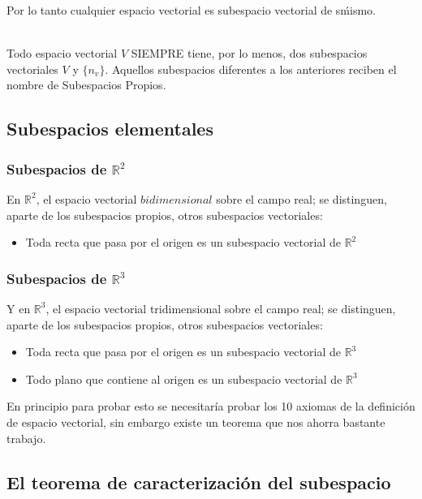 Por lo tanto cualquier espacio vectorial es subespacio vectorial de s\' mismo.

~\\
Todo espacio vectorial $V$ SIEMPRE tiene, por lo menos, dos subespacios vectoriales $V$ y $\lbrace n_v\rbrace$. Aquellos subespacios diferentes a los anteriores reciben el nombre de Subespacios Propios.
~\\
\subsection{Subespacios elementales}
\subsubsection{Subespacios de $\mathbb{R}^2$}
En $\mathbb{R}^2$, el espacio vectorial $bidimensional$ sobre el campo real; se distinguen, aparte de los subespacios propios, otros subespacios vectoriales:


\begin{itemize}
\item Toda recta que pasa por el origen es un subespacio vectorial de $\mathbb{R}^2$

\end{itemize}
\subsubsection{Subespacios de $\mathbb{R}^3$}
Y en $\mathbb{R}^3$, el espacio vectorial tridimensional sobre el campo real; se distinguen, aparte de los subespacios propios, otros subespacios vectoriales:

\begin{itemize}
\item Toda recta que pasa por el origen es un subespacio vectorial de $\mathbb{R}^3$
\item Todo plano que contiene al origen es un subespacio vectorial de $\mathbb{R}^3$
\end{itemize}

En principio para probar esto se necesitaría probar los 10 axiomas de la definición de espacio vectorial, sin embargo existe un teorema que nos ahorra bastante trabajo.


\newpage
\subsection{El teorema de caracterización del subespacio}

